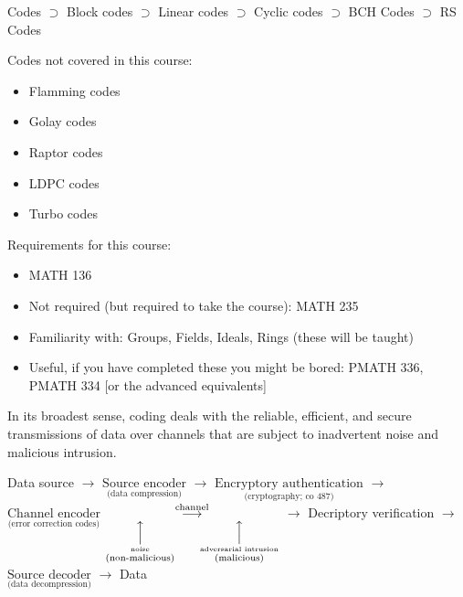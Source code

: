 Codes $ \supset $ Block codes $ \supset $  Linear codes
$ \supset $  Cyclic codes $ \supset $ BCH Codes
$ \supset $ RS Codes

Codes not covered in this course:
\begin{itemize}
    \item Flamming codes
    \item Golay codes
    \item Raptor codes
    \item LDPC codes
    \item Turbo codes
\end{itemize}

Requirements for this course:
\begin{itemize}
    \item MATH 136
    \item Not required (but required to take the course): MATH 235
    \item Familiarity with: Groups, Fields, Ideals, Rings (these will be taught)
    \item Useful, if you have completed these you might be bored:
    PMATH 336, PMATH 334 [or the advanced equivalents]
\end{itemize}


In its broadest sense, coding deals with the reliable, efficient, and secure
transmissions of data over channels that are subject to inadvertent noise and
malicious intrusion.

Data source
$ \rightarrow $
$ \underset{\text{(data compression)}}{\text{Source encoder}} $
$ \rightarrow $
$ \underset{\text{(cryptography; co 487)}}{\text{Encryptory authentication}} $
$ \rightarrow $
$ \underset{\text{(error correction codes)}}{\text{Channel encoder}} $
$ \underset
{
    \overset{\Big\uparrow}{\overset{\text{noise}}{\text{(non-malicious)}}}\qquad
    \overset{\Big\uparrow}{\overset{\text{adversarial intrusion}}{\text{(malicious)}}}
}
{\overset{\text{channel}}{\longrightarrow}} $
$ \rightarrow $
Decriptory verification
$ \rightarrow $
$ \underset{\text{(data decompression)}}{\text{Source decoder}}  $
$ \rightarrow $
Data